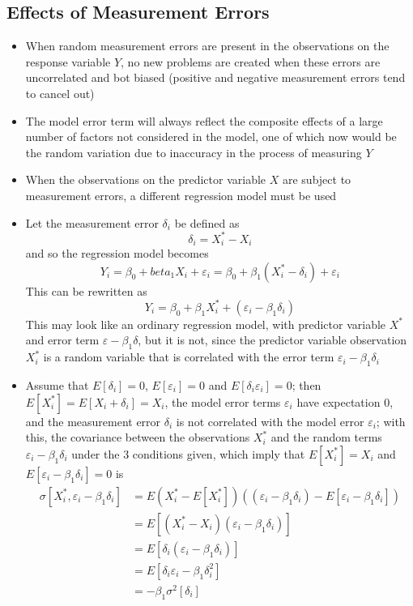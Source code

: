 \subsection{Effects of Measurement Errors} 
\begin{itemize}
\item When random measurement errors are present in the observations on the response variable $Y$, no new problems are created when these errors are uncorrelated and bot biased (positive and negative measurement errors tend to cancel out)
\item The model error term will always reflect the composite effects of a large number of factors not considered in the model, one of which now would be the random variation due to inaccuracy in the process of measuring $Y$
\item When the observations on the predictor variable $X$ are subject to measurement errors, a different regression model must be used
\item Let the measurement error $\delta_i$ be defined as $$ \delta_i = X_i^* - X_i $$ and so the regression model becomes $$ Y_i = \beta_0 + beta_1X_i + \varepsilon_i = \beta_0 + \beta_1(X_i^* - \delta_i) + \varepsilon_i $$ 
This can be rewritten as $$ Y_i = \beta_0 + \beta_1X_i^* + (\varepsilon_i - \beta_1\delta_i) $$ 
This may look like an ordinary regression model, with predictor variable $X^*$ and error term $\varepsilon - \beta_1\delta$, but it is not, since the predictor variable observation $X_i^*$ is a random variable that is correlated with the error term $\varepsilon_i - \beta_1\delta_i$ 
\item Assume that $E[\delta_i] = 0$, $E[\varepsilon_i] = 0$ and $E[\delta_i\varepsilon_i] = 0$; then $E[X_i^*] = E[X_i + \delta_i] = X_i$, the model error terms $\varepsilon_i$ have expectation $0$, and the measurement error $\delta_i$ is not correlated with the model error $\varepsilon_i$; with this, the covariance between the observations $X_i^*$ and the random terms $\varepsilon_i - \beta_1\delta_i$ under the 3 conditions given, which imply that $E[X_i^*] = X_i$ and $E[\varepsilon_i - \beta_1\delta_i] = 0$ is $$ \begin{aligned} \sigma[X_i^*, \varepsilon_i - \beta_1\delta_i] &= E{(X_i^* - E[X_i^*])((\varepsilon_i - \beta_1\delta_i) - E[\varepsilon_i - \beta_1\delta_i])} \\ &= E[(X_i^* - X_i)(\varepsilon_i - \beta_1\delta_i)] \\ &= E[\delta_i(\varepsilon_i - \beta_1\delta_i)] \\ &= E[\delta_i\varepsilon_i - \beta_1\delta_i^2] \\ &= -\beta_1\sigma^2[\delta_i] \end{aligned} $$ 

\end{itemize}
